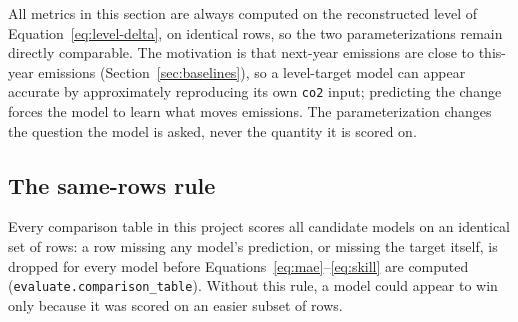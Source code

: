 All metrics in this section are always computed on the reconstructed
level of Equation~\ref{eq:level-delta}, on identical rows, so the two
parameterizations remain directly comparable. The motivation is that
next-year emissions are close to this-year emissions
(Section~\ref{sec:baselines}), so a level-target model can appear
accurate by approximately reproducing its own \texttt{co2} input;
predicting the change forces the model to learn what moves emissions.
The parameterization changes the question the model is asked, never the
quantity it is scored on.

\subsection{The same-rows rule}

Every comparison table in this project scores all candidate models on an
identical set of rows: a row missing any model's prediction, or missing
the target itself, is dropped for every model before
Equations~\ref{eq:mae}--\ref{eq:skill} are computed
(\texttt{evaluate.comparison\_table}). Without this rule, a model could
appear to win only because it was scored on an easier subset of rows.

